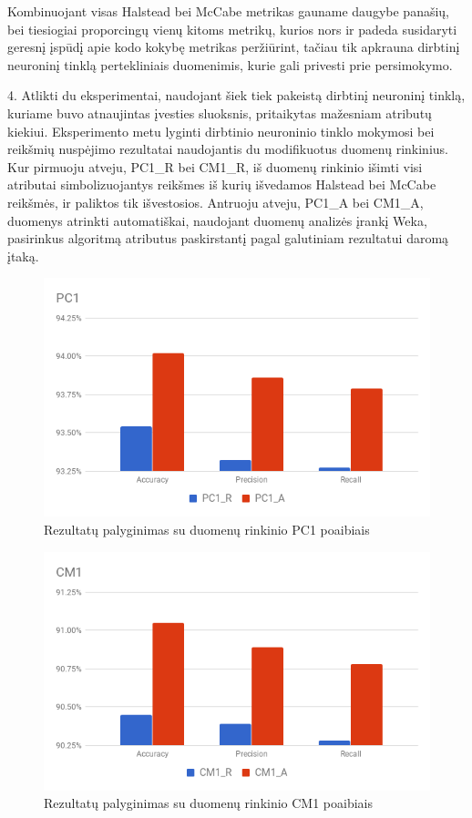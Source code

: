 \documentclass{VUMIFPSbakalaurinis}
\begin{document}
Kombinuojant visas Halstead bei McCabe metrikas gauname daugybe panašių, bei tiesiogiai proporcingų vienų kitoms metrikų, kurios nors ir padeda susidaryti geresnį įspūdį apie kodo kokybę metrikas peržiūrint, tačiau tik apkrauna dirbtinį neuroninį tinklą pertekliniais duomenimis, kurie gali privesti prie persimokymo.

4. Atlikti du eksperimentai, naudojant šiek tiek pakeistą dirbtinį neuroninį tinklą, kuriame buvo atnaujintas įvesties sluoksnis, pritaikytas mažesniam atributų kiekiui. Eksperimento metu lyginti dirbtinio neuroninio tinklo mokymosi bei reikšmių nuspėjimo rezultatai naudojantis du modifikuotus duomenų rinkinius. Kur pirmuoju atveju, PC1\_R bei CM1\_R, iš duomenų rinkinio išimti visi atributai simbolizuojantys reikšmes iš kurių išvedamos Halstead bei McCabe reikšmės, ir paliktos tik išvestosios. Antruoju atveju, PC1\_A bei CM1\_A, duomenys atrinkti automatiškai, naudojant duomenų analizės įrankį Weka, pasirinkus algoritmą atributus paskirstantį pagal galutiniam rezultatui daromą įtaką.

\begin{figure}[H]
    \centering
    \includegraphics[scale=0.5]{img/chart-3}
    \caption{Rezultatų palyginimas su duomenų rinkinio PC1 poaibiais}
    \label{img:chart3}
\end{figure}

\begin{figure}[H]
    \centering
    \includegraphics[scale=0.5]{img/chart-4}
    \caption{Rezultatų palyginimas su duomenų rinkinio CM1 poaibiais}
    \label{img:chart4}
\end{figure}
\end{document}
